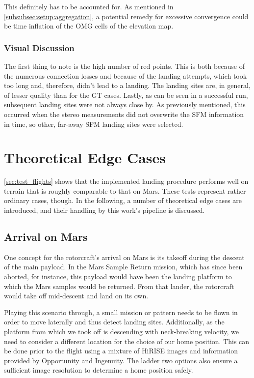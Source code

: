     This definitely has to be accounted for. As mentioned in \cref{subsubsec:setup:aggregation}, a potential remedy for excessive convergence could be time inflation of the OMG cells of the elevation map.
    
    \subsubsection{Visual Discussion}
    The first thing to note is the high number of red points. This is both because of the numerous connection losses and because of the landing attempts, which took too long and, therefore, didn't lead to a landing. The landing sites are, in general, of lesser quality than for the GT cases. Lastly, as can be seen in a successful run, subsequent landing sites were not always close by. As previously mentioned, this occurred when the stereo measurements did not overwrite the SFM information in time, so other, far-away SFM landing sites were selected.

\section{Theoretical Edge Cases}
\cref{sec:test_flights} shows that the implemented landing procedure performs well on terrain that is roughly comparable to that on Mars. These tests represent rather ordinary cases, though. In the following, a number of theoretical edge cases are introduced, and their handling by this work's pipeline is discussed.

\subsection{Arrival on Mars}
One concept for the rotorcraft's arrival on Mars is its takeoff during the descent of the main payload. In the Mars Sample Return mission, which has since been aborted, for instance, this payload would have been the landing platform to which the Mars samples would be returned. From that lander, the rotorcraft would take off mid-descent and land on its own.

Playing this scenario through, a small mission or pattern needs to be flown in order to move laterally and thus detect landing sites. Additionally, as the platform from which we took off is descending with neck-breaking velocity, we need to consider a different location for the choice of our home position. This can be done prior to the flight using a mixture of HiRISE images and information provided by Opportunity and Ingenuity. The ladder two options also ensure a sufficient image resolution to determine a home position safely.

